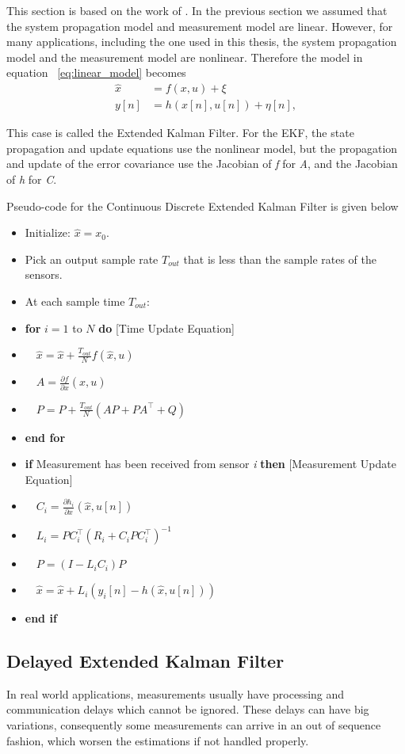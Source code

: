 This section is based on the work of \cite{Beard2010}. In the previous section we assumed that the system propagation model and measurement model are linear. However, for many applications, including the one used in this thesis, the system propagation model and the measurement model are nonlinear. Therefore the model in equation ~\ref{eq:linear_model} becomes
\begin{align}
\hat{x}&=f(x,u)+\xi \\
y[n]&=h(x[n],u[n])+\eta[n],
\end{align}

This case is called the Extended Kalman Filter. For the EKF, the state propagation and update equations use the nonlinear model, but the propagation and update of the error covariance use the Jacobian of \textit{f} for \textit{A}, and the Jacobian of \textit{h} for \textit{C}.

Pseudo-code for the Continuous Discrete Extended Kalman Filter is given below
\renewcommand{\labelitemi}{$\cdot$}
\begin{itemize}[nosep]
\item Initialize: $ \hat{x}=x_0 $.
\item Pick an output sample rate $T_{out}$ that is less than the sample rates of the sensors.
\item At each sample time $T_{out}$:

\item \textbf{for} $ i=1 $ to $ N $ \textbf{do} [Time Update Equation]
\item $ \quad \hat{x} = \hat{x} + \frac{T_{out}}{N}f(\hat{x},u) $
\item $ \quad A = \frac{\partial f}{\partial x}(\hat{x},u)$
\item $ \quad P=P+\frac{T_{out}}{N}(AP+PA^\top+Q) $
\item \textbf{end for}
\item \textbf{if} Measurement has been received from sensor \textit{i} \textbf{then} [Measurement Update Equation]
\item $ \quad C_i=\frac{\partial h_i}{\partial x}(\hat{x},u[n])$
\item $ \quad L_i=PC_i^\top(R_i+C_i P C_i^\top)^{-1}$
\item $ \quad P=(I-L_iC_i)P$
\item $ \quad \hat{x}=\hat{x}+L_i(y_i[n]-h(\hat{x},u[n]))$
\item \textbf{end if}
\end{itemize}

\subsection{Delayed Extended Kalman Filter}{\label{sub:DEKF}}
In real world applications, measurements usually have processing and communication delays which cannot be ignored. These delays can have big variations, consequently some measurements can arrive in an out of sequence fashion, which worsen the estimations if not handled properly.

